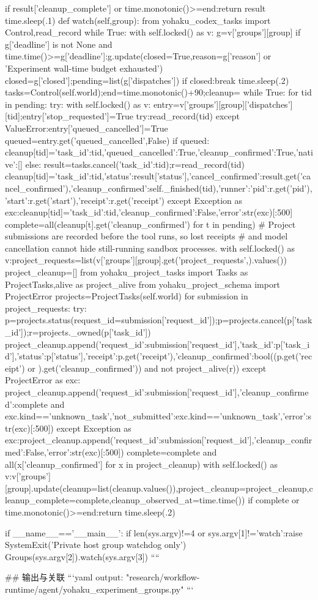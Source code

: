    if result['cleanup_complete'] or time.monotonic()>=end:return result
   time.sleep(.1)
 def watch(self,group):
  from yohaku_codex_tasks import Control,read_record
  while True:
   with self.locked() as v:
    g=v['groups'][group]
    if g['deadline'] is not None and time.time()>=g['deadline']:g.update(closed=True,reason=g['reason'] or 'Experiment wall-time budget exhausted')
    closed=g['closed'];pending=list(g['dispatches'])
   if closed:break
   time.sleep(.2)
  tasks=Control(self.world);end=time.monotonic()+90;cleanup={}
  while True:
   for tid in pending:
    try:
     with self.locked() as v:
      entry=v['groups'][group]['dispatches'][tid];entry['stop_requested']=True
      try:read_record(tid)
      except ValueError:entry['queued_cancelled']=True
      queued=entry.get('queued_cancelled',False)
     if queued:
      cleanup[tid]={'task_id':tid,'queued_cancelled':True,'cleanup_confirmed':True,'native':[]}
     else:
      result=tasks.cancel({'task_id':tid});r=read_record(tid)
      cleanup[tid]={'task_id':tid,'status':result['status'],'cancel_confirmed':result.get('cancel_confirmed'),'cleanup_confirmed':self._finished(tid),'runner':{'pid':r.get('pid'),'start':r.get('start')},'receipt':r.get('receipt')}
    except Exception as exc:cleanup[tid]={'task_id':tid,'cleanup_confirmed':False,'error':str(exc)[:500]}
   complete=all(cleanup[t].get('cleanup_confirmed') for t in pending)
   # Project submissions are recorded before the tool runs, so lost receipts
   # and model cancellation cannot hide still-running sandbox processes.
   with self.locked() as v:project_requests=list(v['groups'][group].get('project_requests',{}).values())
   project_cleanup=[]
   from yohaku_project_tasks import Tasks as ProjectTasks,alive as project_alive
   from yohaku_project_schema import ProjectError
   projects=ProjectTasks(self.world)
   for submission in project_requests:
    try:
     p=projects.status(request_id=submission['request_id']);p=projects.cancel(p['task_id']);r=projects._owned(p['task_id'])
     project_cleanup.append({'request_id':submission['request_id'],'task_id':p['task_id'],'status':p['status'],'receipt':p.get('receipt'),'cleanup_confirmed':bool((p.get('receipt') or {}).get('cleanup_confirmed')) and not project_alive(r)})
    except ProjectError as exc:
     project_cleanup.append({'request_id':submission['request_id'],'cleanup_confirmed':complete and exc.kind=='unknown_task','not_submitted':exc.kind=='unknown_task','error':str(exc)[:500]})
    except Exception as exc:project_cleanup.append({'request_id':submission['request_id'],'cleanup_confirmed':False,'error':str(exc)[:500]})
   complete=complete and all(x['cleanup_confirmed'] for x in project_cleanup)
   with self.locked() as v:v['groups'][group].update(cleanup=list(cleanup.values()),project_cleanup=project_cleanup,cleanup_complete=complete,cleanup_observed_at=time.time())
   if complete or time.monotonic()>=end:return
   time.sleep(.2)

if __name__=='__main__':
 if len(sys.argv)!=4 or sys.argv[1]!='watch':raise SystemExit('Private host group watchdog only')
 Groups(sys.argv[2]).watch(sys.argv[3])
````

## 输出与关联
```yaml
output: "research/workflow-runtime/agent/yohaku_experiment_groups.py"
```

